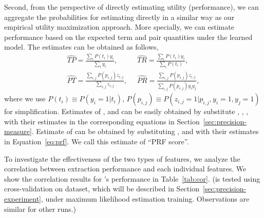 Second, from the perspective of directly estimating utility (performance), we can aggregate the probabilities for estimating \PRF directly in a similar way as our empirical utility maximization approach. More specially, we can estimate \PRF performance based on the expected term and pair quantities under the learned model. The estimates can be obtained as follows,
\begin{equation}
\label{eq:mest} %
\begin{split}
\widehat{T\!P}=\frac{\sum_i P(t_i)y_i}{\sum_i y_i}, &\;\; \widehat{T\!R}=\frac{\sum_i P(t_i)y_i}{\sum_i P(t_i)},\\ 
\widehat{P\!T}=\frac{\sum_{i,j} P(p_{i,j})z_{i,j}}{\sum_{i,j} z_{i,j}},&\;\; \widehat{P\!R}=\frac{\sum_{i,j} P(p_{i,j})z_{i,j}}{\sum_{i,j} P(p_{i,j})y_iy_j},
\end{split}
\end{equation}
where we use $P(t_i)\equiv P(y_i\!=\!1|t_i)$, $P(p_{i,j})\equiv P(z_{i,j}\!=\!1|p_{i,j}, y_i\!=\!1,y_j\!=\!1)$ for simplification. Estimates of \TF, \PF and can be easily obtained by substitute \TP, \TR, \PP, \PR with their estimates in the corresponding equations in Section~\ref{sec:precision-measure}. Estimate of \PRF can be obtained by substituting \TP, \TR and \PF with their estimates in Equation~\ref{eq:prf}. We call this estimate of \PRF ``PRF score''.

To investigate the effectiveness of the two types of features, we analyze the correlation between extraction performance and each individual features. We show the correlation results for \QFI's  performance in Table~\ref{tab:cor}. (\QFI is tested using cross-validation on \DQF dataset, which will be described in Section~\ref{sec:precision-experiment}, under maximum likelihood estimation training. Observations are similar for other runs.) 

